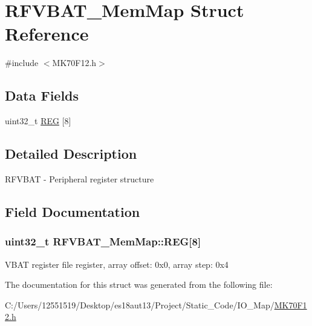 \hypertarget{struct_r_f_v_b_a_t___mem_map}{}\section{R\+F\+V\+B\+A\+T\+\_\+\+Mem\+Map Struct Reference}
\label{struct_r_f_v_b_a_t___mem_map}


{\ttfamily \#include $<$M\+K70\+F12.\+h$>$}

\subsection*{Data Fields}
\begin{DoxyCompactItemize}
\item 
uint32\+\_\+t \hyperlink{struct_r_f_v_b_a_t___mem_map_a21ddc52aa162e182f22011520b5bf93b}{R\+E\+G} \mbox{[}8\mbox{]}
\end{DoxyCompactItemize}


\subsection{Detailed Description}
R\+F\+V\+B\+A\+T -\/ Peripheral register structure 

\subsection{Field Documentation}
\hypertarget{struct_r_f_v_b_a_t___mem_map_a21ddc52aa162e182f22011520b5bf93b}{}
\subsubsection[{R\+E\+G}]{\setlength{\rightskip}{0pt plus 5cm}uint32\+\_\+t R\+F\+V\+B\+A\+T\+\_\+\+Mem\+Map\+::\+R\+E\+G\mbox{[}8\mbox{]}}\label{struct_r_f_v_b_a_t___mem_map_a21ddc52aa162e182f22011520b5bf93b}
V\+B\+A\+T register file register, array offset\+: 0x0, array step\+: 0x4 

The documentation for this struct was generated from the following file\+:\begin{DoxyCompactItemize}
\item 
C\+:/\+Users/12551519/\+Desktop/es18aut13/\+Project/\+Static\+\_\+\+Code/\+I\+O\+\_\+\+Map/\hyperlink{_m_k70_f12_8h}{M\+K70\+F12.\+h}\end{DoxyCompactItemize}
